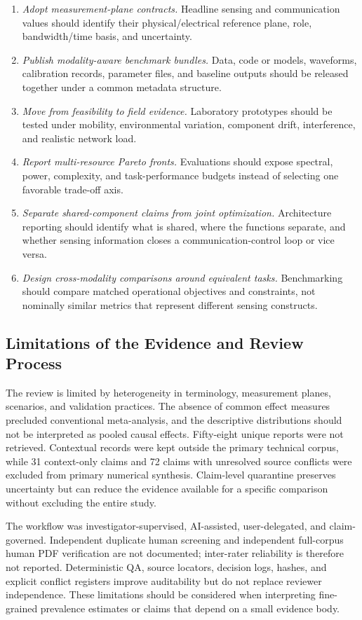 \begin{enumerate}
\item \emph{Adopt measurement-plane contracts.} Headline sensing and
communication values should identify their physical/electrical reference
plane, role, bandwidth/time basis, and uncertainty.
\item \emph{Publish modality-aware benchmark bundles.} Data, code or models,
waveforms, calibration records, parameter files, and baseline outputs should
be released together under a common metadata structure.
\item \emph{Move from feasibility to field evidence.} Laboratory prototypes
should be tested under mobility, environmental variation, component drift,
interference, and realistic network load.
\item \emph{Report multi-resource Pareto fronts.} Evaluations should expose
spectral, power, complexity, and task-performance budgets instead of selecting
one favorable trade-off axis.
\item \emph{Separate shared-component claims from joint optimization.}
Architecture reporting should identify what is shared, where the functions
separate, and whether sensing information closes a communication-control loop
or vice versa.
\item \emph{Design cross-modality comparisons around equivalent tasks.}
Benchmarking should compare matched operational objectives and constraints,
not nominally similar metrics that represent different sensing constructs.
\end{enumerate}

\subsection{Limitations of the Evidence and Review Process}

The review is limited by heterogeneity in terminology, measurement planes,
scenarios, and validation practices. The absence of common effect measures
precluded conventional meta-analysis, and the descriptive distributions
should not be interpreted as pooled causal effects. Fifty-eight unique reports
were not retrieved. Contextual records were kept outside the primary technical
corpus, while 31 context-only claims and 72 claims with unresolved source
conflicts were excluded from primary numerical synthesis. Claim-level
quarantine preserves uncertainty but can reduce the evidence available for a
specific comparison without excluding the entire study.

The workflow was investigator-supervised, AI-assisted, user-delegated, and
claim-governed. Independent duplicate human screening and independent
full-corpus human PDF verification are not documented; inter-rater reliability
is therefore not reported. Deterministic QA, source locators, decision logs,
hashes, and explicit conflict registers improve auditability but do not replace
reviewer independence. These limitations should be considered when
interpreting fine-grained prevalence estimates or claims that depend on a
small evidence body.

